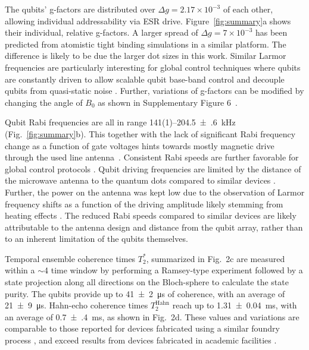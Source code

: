 \documentclass[superscriptaddress,twocolumn,10pt,prl,floatfix,nofootinbib,aps]{revtex4-2}
\newcommand{\change}[1]{%
\textcolor{reviewercolor}{\ignorespaces#1\unskip}%
}
\begin{document}
The qubits' g-factors are distributed over $\Delta g = 2.17\times10^{-3}$ of each other, allowing individual addressability via ESR drive. Figure~\ref{fig:summary}a shows their individual, relative g-factors. 
A larger spread of $\Delta g = 7\times10^{-3}$ has been predicted from atomistic tight binding simulations in a similar platform\cite{cifuentes_bounds_2024}. The difference is likely to be due the larger dot sizes in this work. Similar Larmor frequencies are particularly interesting for global control techniques where qubits are constantly driven to allow scalable qubit base-band control and decouple qubits from quasi-static noise \cite{seedhouse_quantum_2021, hansen_entangling_2024}.
Further, variations of g-factors can be modified by changing the angle of $B_0$ as shown in Supplementary Figure 6~\cite{tanttu_controlling_2019, jock_silicon_2018, cifuentes_bounds_2024}.

Qubit Rabi frequencies are all in range 141(1)--\SI{204.5(6)}{\kilo \hertz} (Fig.~\ref{fig:summary}b). This together with the lack of significant Rabi frequency change as a function of gate voltages hints towards mostly magnetic drive through the used line antenna~\cite{leon_bell-state_2021, gilbert_-demand_2023}. Consistent Rabi speeds are further favorable for global control protocols \cite{hansen_pulse_2021, seedhouse_quantum_2021}. Qubit driving frequencies are limited by the distance of the microwave antenna to the quantum dots compared to similar devices \cite{steinacker_bell_2025, huang_high-fidelity_2024}. Further, the power on the antenna was kept low due to the observation of Larmor frequency shifts as a function of the driving amplitude likely stemming from heating effects \cite{undseth_hotter_2023-1, noauthor_optimized_nodate, tanttu_assessment_2024}.
\change{
    The reduced Rabi speeds compared to similar devices \cite{huang_high-fidelity_2024, steinacker_industry-compatible_2025, jones_mid-circuit_2026} are likely attributable to the antenna design and distance from the qubit array, rather than to an inherent limitation of the qubits themselves.
}

\change{
    Temporal ensemble coherence times $T_2^*$, summarized in Fig.~2c are measured within a $\sim$\SI{4}{\min} time window by performing a Ramsey-type experiment followed by a state projection along all directions on the Bloch-sphere to calculate the state purity.
    The qubits provide up to \SI{41(2)}{\micro \second} of coherence, with an average of \SI{21(9)}{\micro\second}.
    Hahn-echo coherence times $T_2^{\mathrm{Hahn}}$ reach up to \SI{1.31(4)}{\milli \second}, with an average of \SI{0.7(4)}{\milli \second}, as shown in Fig.~2d.
    These values and variations are comparable to those reported for devices fabricated using a similar foundry process \cite{steinacker_industry-compatible_2025}, and exceed results from devices fabricated in academic facilities \cite{huang_high-fidelity_2024, jones_mid-circuit_2026}.
}
\end{document}
